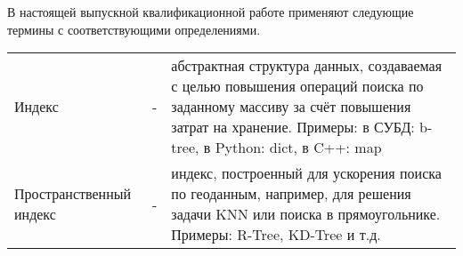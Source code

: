   \Defines %

В настоящей выпускной квалификационной работе применяют следующие термины с соответствующими определениями.

\vspace{1em}

\noindent
\begin{tabularx}{\textwidth}{m{4cm} m{0.5cm} X}
Индекс & - & абстрактная структура данных, создаваемая с целью повышения операций поиска по заданному массиву за счёт повышения затрат на хранение. Примеры: в СУБД: b-tree, в Python: dict, в C++: map \\
Пространственный индекс & - & индекс, построенный для ускорения поиска по геоданным, например, для решения задачи KNN или поиска в прямоугольнике. Примеры: R-Tree, KD-Tree и т.д. \\
\end{tabularx}

